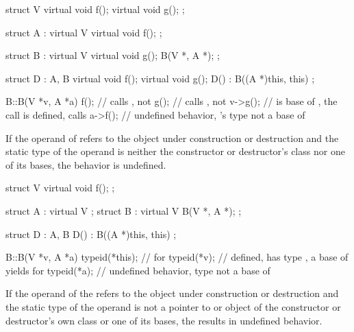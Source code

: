 \pnum
\begin{example}
\begin{codeblock}
struct V {
  virtual void f();
  virtual void g();
};

struct A : virtual V {
  virtual void f();
};

struct B : virtual V {
  virtual void g();
  B(V *, A *);
};

struct D : A, B {
  virtual void f();
  virtual void g();
  D() : B((A *)this, this) {}
};

B::B(V *v, A *a) {
  f();          // calls , not 
  g();          // calls , not 
  v->g();       //  is base of , the call is defined, calls 
  a->f();       // undefined behavior, 's type not a base of 
}
\end{codeblock}
\end{example}


\pnum
If the operand of  refers to
the object under construction or destruction and the static type of the operand is neither the constructor or
destructor's class nor one of its bases, the behavior is undefined.

\pnum
\begin{example}
\begin{codeblock}
struct V {
  virtual void f();
};

struct A : virtual V {};
struct B : virtual V {
  B(V *, A *);
};

struct D : A, B {
  D() : B((A *)this, this) {}
};

B::B(V *v, A *a) {
  typeid(*this);        //  for 
  typeid(*v);           // defined,  has type , a base of  yields  for 
  typeid(*a);           // undefined behavior, type  not a base of 
}
\end{codeblock}
\end{example}


\pnum
If the operand of the 
refers to the object under construction or destruction
and the static type of the operand
is not a pointer to or object of
the constructor or destructor's own class or one of its bases,
the  results in undefined behavior.

